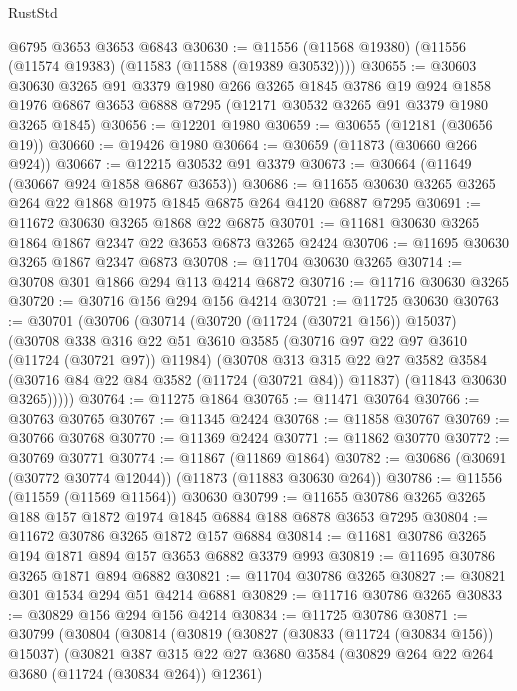 \begin{lexlean}{RustStd}
\begin{coremodule}
    @6795
    @3653
    @3653
    @6843
@30630 := @11556 (@11568 @19380) (@11556 (@11574 @19383) (@11583 (@11588 (@19389 @30532))))
@30655 := @30603
    @30630
    @3265
    @91
    @3379
    @1980
    @266
    @3265
    @1845
    @3786
    @19
    @924
    @1858
    @1976
    @6867
    @3653
    @6888
    @7295
    (@12171 @30532 @3265 @91 @3379 @1980 @3265 @1845)
@30656 := @12201 @1980
@30659 := @30655 (@12181 (@30656 @19))
@30660 := @19426 @1980
@30664 := @30659 (@11873 (@30660 @266 @924))
@30667 := @12215 @30532 @91 @3379
@30673 := @30664 (@11649 (@30667 @924 @1858 @6867 @3653))
@30686 := @11655 @30630 @3265 @3265 @264 @22 @1868 @1975 @1845 @6875 @264 @4120 @6887 @7295
@30691 := @11672 @30630 @3265 @1868 @22 @6875
@30701 := @11681 @30630 @3265 @1864 @1867 @2347 @22 @3653 @6873 @3265 @2424
@30706 := @11695 @30630 @3265 @1867 @2347 @6873
@30708 := @11704 @30630 @3265
@30714 := @30708 @301 @1866 @294 @113 @4214 @6872
@30716 := @11716 @30630 @3265
@30720 := @30716 @156 @294 @156 @4214
@30721 := @11725 @30630
@30763 := @30701
    (@30706
      (@30714
        (@30720 (@11724 (@30721 @156)) @15037)
        (@30708
          @338
          @316
          @22
          @51
          @3610
          @3585
          (@30716 @97 @22 @97 @3610 (@11724 (@30721 @97)) @11984)
          (@30708
            @313
            @315
            @22
            @27
            @3582
            @3584
            (@30716 @84 @22 @84 @3582 (@11724 (@30721 @84)) @11837)
            (@11843 @30630 @3265)))))
@30764 := @11275 @1864
@30765 := @11471 @30764
@30766 := @30763 @30765
@30767 := @11345 @2424
@30768 := @11858 @30767
@30769 := @30766 @30768
@30770 := @11369 @2424
@30771 := @11862 @30770
@30772 := @30769 @30771
@30774 := @11867 (@11869 @1864)
@30782 := @30686 (@30691 (@30772 @30774 @12044)) (@11873 (@11883 @30630 @264))
@30786 := @11556 (@11559 (@11569 @11564)) @30630
@30799 := @11655 @30786 @3265 @3265 @188 @157 @1872 @1974 @1845 @6884 @188 @6878 @3653 @7295
@30804 := @11672 @30786 @3265 @1872 @157 @6884
@30814 := @11681 @30786 @3265 @194 @1871 @894 @157 @3653 @6882 @3379 @993
@30819 := @11695 @30786 @3265 @1871 @894 @6882
@30821 := @11704 @30786 @3265
@30827 := @30821 @301 @1534 @294 @51 @4214 @6881
@30829 := @11716 @30786 @3265
@30833 := @30829 @156 @294 @156 @4214
@30834 := @11725 @30786
@30871 := @30799
    (@30804
      (@30814
        (@30819
          (@30827
            (@30833 (@11724 (@30834 @156)) @15037)
            (@30821
              @387
              @315
              @22
              @27
              @3680
              @3584
              (@30829 @264 @22 @264 @3680 (@11724 (@30834 @264)) @12361)

\end{coremodule}
\end{lexlean}
